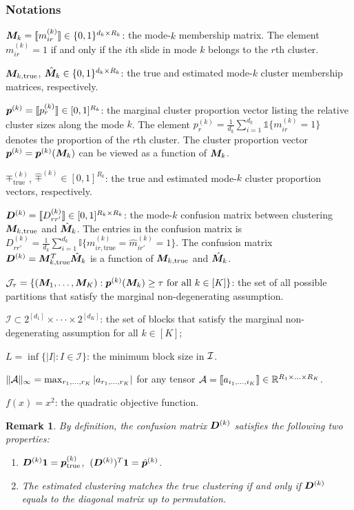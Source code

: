 \documentclass{article}
\newtheorem{remark}{Remark}
\begin{document}
\begin{appendices}
\subsubsection{Notations}\label{sec:notations}
$\bm M_{k}= \llbracket m_{ir}^{(k)} \rrbracket \in \{0,1\}^{d_k\times R_k}$: the mode-$k$ membership matrix. The element $m_{ir}^{(k)}=1$ if and only if the $i$th slide in mode $k$ belongs to the $r$th cluster.


$\bm M_{k,\text{true}}$, $\hat {\bm M}_{k} \in \{0,1\}^{d_k\times R_k}$: the true and estimated mode-$k$ cluster membership matrices, respectively.


$\bm{p}^{(k)} = \llbracket p^{(k)}_r \rrbracket \in [0,1]^{R_k}$: the marginal cluster proportion vector listing the relative cluster sizes along the mode $k$. The element $p_{r}^{(k)}=\frac{1}{d_k}\sum_{i=1}^{d_k}\mathds{1}\{m_{ir}^{(k)}=1\}$ denotes the proportion of the $r$th cluster. The cluster proportion vector $\bm{p}^{(k)}=\bm{p}^{(k)}(\bm M_k)$ can be viewed as a function of $\bm M_{k}$.

$ \mp^{(k)}_{\text{true}}$, $\hat \mp^{(k)} \in [0,1]^{R_k}$: the true and estimated mode-$k$ cluster proportion vectors, respectively.


$\bm{D}^{(k)} = \llbracket D^{(k)}_{rr'} \rrbracket\in [0,1]^{R_k\times R_k}$: the mode-$k$ confusion matrix between clustering $\bm M_{k,\text{true}}$ and $\hat {\bm M}_{k}$. The entries in the confusion matrix is $D_{rr'}^{(k)}=\frac{1}{d_k}\sum_{i=1}^{d_k}\mathbb{I}\{m_{ir,\text{true}}^{(k)}=\hat m_{ir'}^{(k)}=1\}$. The confusion matrix $\bm{D}^{(k)}=\bm M^T_{k,\text{true}}\hat {\bm M}_k$ is a function of $\bm M_{k,\text{true}}$ and $\hat {\bm M}_k$.

$\mathcal{J}_{\tau}=\{(\bm M_1,\ldots,\bm M_K): \bm{p}^{(k)}(\bm M_k)\geq \tau \text{ for all } k\in[K]\}$: the set of all possible partitions that satisfy the marginal non-degenerating assumption. 

$\mathcal{I} \subset 2^{[d_1]}\times \cdot\cdot\cdot \times 2^{[d_K]}$: the set of blocks that satisfy the marginal non-degenerating assumption for all $k\in[K]$;

$L=\inf\{|I|: I\in\mathcal{I}\}$: the minimum block size in $\mathcal{I}$. 

$\lVert\mathcal{A}\rVert_\infty=\max_{r_1,\ldots,r_K}|a_{r_1,\ldots,r_K}|$ for any tensor $\mathcal{A}=\llbracket a_{i_1,\ldots,i_K} \rrbracket\in\mathbb{R}^{R_1\times\ldots \times R_K}$.

$f(x)=x^2$: the quadratic objective function. 

\begin{remark}
By definition, the confusion matrix $\bm{D}^{(k)}$ satisfies the following two properties:
\begin{enumerate}
\item $\bm{D}^{(k)}\boldsymbol{1}=\bm{p}^{(k)}_{\text{true}}$,\ $(\bm{D}^{(k)})^T\boldsymbol{1} =\hat {\bm{p}}^{(k)}$.
\item The estimated clustering matches the true clustering if and only if $\bm{D}^{(k)}$ equals to the diagonal matrix up to permutation. 
\end{enumerate}
\end{remark}


\end{appendices}
\end{document}
